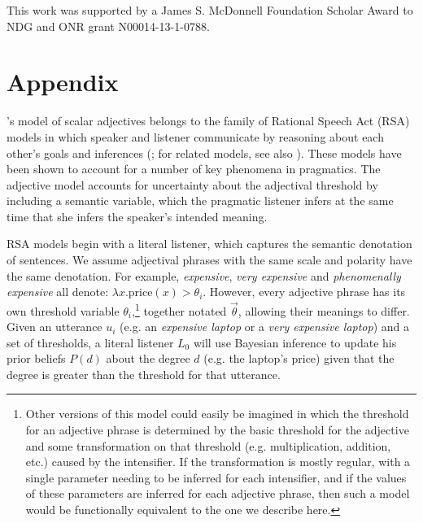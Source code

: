 \documentclass[10pt,letterpaper]{article}
\newcommand{\w}[1]{\emph{#1}}
\begin{document}
This work was supported by a James S. McDonnell Foundation Scholar Award to NDG and ONR grant N00014-13-1-0788.



\setlength{\bibleftmargin}{.125in}
\setlength{\bibindent}{-\bibleftmargin}



\section{Appendix} \label{app:model}

 's model of scalar adjectives belongs to the family of Rational Speech Act (RSA) models in which speaker and listener communicate by  reasoning about each other's goals and inferences (; for related models, see also ). 
 These models have been shown to account for a number of key phenomena in pragmatics. The adjective model accounts for uncertainty about the adjectival threshold by including a semantic variable, which the pragmatic listener infers at the same time that she infers the speaker's intended meaning. 

RSA models begin with a literal listener, which captures the semantic denotation of sentences. 
We assume adjectival phrases with the same scale and polarity have the same denotation. For example, \w{expensive}, \w{very expensive} and \w{phenomenally expensive} all denote: $\lambda x . \text{price}(x) > \theta_i$. %
However, every adjective phrase has its own threshold variable $\theta_i$,\footnote{Other versions of this model could easily be imagined in which the threshold for an adjective phrase is determined by the basic threshold for the adjective and some transformation on that threshold (e.g. multiplication, addition, etc.) caused by the intensifier. If the transformation is mostly regular, with a single parameter needing to be inferred for each intensifier, and if the values of these parameters are inferred for each adjective phrase, then such a model would be functionally equivalent to the one we describe here.} together notated $\vec{\theta}$, allowing their meanings to differ.
Given an utterance $u_i$ (e.g. an \w{expensive laptop} or a \w{very expensive laptop}) and a set of thresholds, a literal listener $L_0$ will use Bayesian inference to update his prior beliefs $P(d)$ about the degree $d$ (e.g. the laptop's price) given that the degree is greater than the threshold for that utterance.
\end{document}
